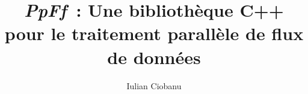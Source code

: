 \documentclass[12pt,twoside]{latex/memoireuqam1.3} %
\begin{document}

\title{\emph{P\lowercase{p}F\lowercase{f}}~: Une bibliothèque C++ pour le traitement parall\`ele de flux de donn\'ees}

\author{Iulian Ciobanu}
\uqammemoire
{}

\thispagestyle{empty}
\maketitle


\renewcommand \bibname{BIBLIOGRAPHIE}

\renewcommand \listfigurename{LISTE DES FIGURES}
\renewcommand \listtablename{LISTE DES TABLEAUX}
\renewcommand \lstlistlistingname{LISTE DES LISTINGS}
\renewcommand \appendixname{ANNEXE}
\renewcommand \figurename{Figure}
\renewcommand \tablename{Tableau}

\addtocounter{page}{1}





\setcounter{tocdepth}{2}

\tableofcontents
\listoffigures
\listoftables

\lstlistoflistings
{}





\end{document}
